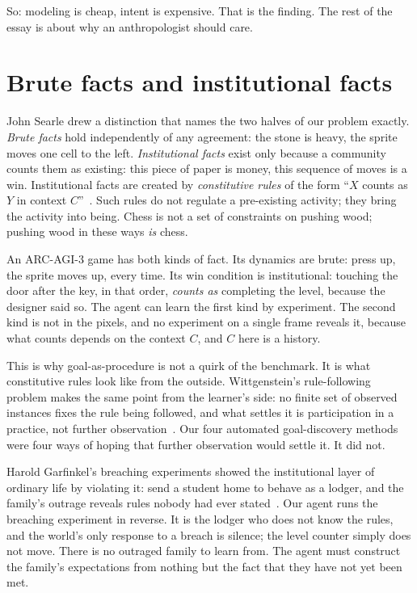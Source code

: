 \documentclass[11pt]{article}
\begin{document}
So: modeling is cheap, intent is expensive. That is the finding. The rest of the essay is about why an
anthropologist should care.

\section{Brute facts and institutional facts}
\label{sec:facts}

John Searle drew a distinction that names the two halves of our problem exactly. \emph{Brute facts} hold
independently of any agreement: the stone is heavy, the sprite moves one cell to the left.
\emph{Institutional facts} exist only because a community counts them as existing: this piece of paper is
money, this sequence of moves is a win. Institutional facts are created by \emph{constitutive rules} of
the form ``$X$ counts as $Y$ in context $C$''~\cite{searle1995construction}. Such rules do not regulate a
pre-existing activity; they bring the activity into being. Chess is not a set of constraints on pushing
wood; pushing wood in these ways \emph{is} chess.

An ARC-AGI-3 game has both kinds of fact. Its dynamics are brute: press up, the sprite moves up, every
time. Its win condition is institutional: touching the door after the key, in that order, \emph{counts
as} completing the level, because the designer said so. The agent can learn the first kind by
experiment. The second kind is not in the pixels, and no experiment on a single frame reveals it, because
what counts depends on the context $C$, and $C$ here is a history.

This is why goal-as-procedure is not a quirk of the benchmark. It is what constitutive rules look like from
the outside. Wittgenstein's rule-following problem makes the same point from the learner's side: no finite
set of observed instances fixes the rule being followed, and what settles it is participation in a
practice, not further observation~\cite{wittgenstein1953pi}. Our four automated goal-discovery methods
were four ways of hoping that further observation would settle it. It did not.

Harold Garfinkel's breaching experiments showed the institutional layer of ordinary life by violating it:
send a student home to behave as a lodger, and the family's outrage reveals rules nobody had ever
stated~\cite{garfinkel1967studies}. Our agent runs the breaching experiment in reverse. It is the lodger
who does not know the rules, and the world's only response to a breach is silence; the level counter
simply does not move. There is no outraged family to learn from. The agent must construct the family's
expectations from nothing but the fact that they have not yet been met.
\end{document}
